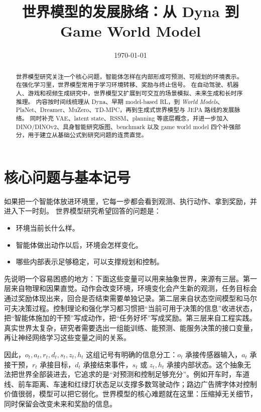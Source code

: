 \documentclass[11pt,a4paper]{ctexart}
\title{\textbf{世界模型的发展脉络：从 Dyna 到 Game World Model}}
\author{}
\date{\today}
\begin{document}
\maketitle

\begin{abstract}
世界模型研究关注一个核心问题，智能体怎样在内部形成可预测、可规划的环境表示。
在强化学习里，世界模型常用于学习环境转移、奖励与终止信号。
在自动驾驶、机器人、游戏和视频生成研究中，世界模型又扩展到可交互的场景模拟、未来生成和长时序推理。
内容按时间线梳理从 Dyna、早期 model-based RL，到 \emph{World Models}、PlaNet、Dreamer、MuZero、TD-MPC，再到生成式世界模型与 JEPA 路线的发展脉络。
同时补充 VAE、latent state、RSSM、planning 等底层概念，并进一步加入 DINO/DINOv2、具身智能研究版图、benchmark 以及 game world model 四个补强部分，用于建立从基础公式到研究问题的连贯直觉。
\end{abstract}

\tableofcontents
\clearpage

\section{核心问题与基本记号}

如果把一个智能体放进环境里，它每一步都会看到观测、执行动作、拿到奖励，并进入下一时刻。
世界模型研究希望回答的问题是：

\begin{itemize}
  \item 环境当前长什么样。
  \item 智能体做出动作以后，环境会怎样变化。
  \item 哪些内部表示足够稳定，可以支撑规划和控制。
\end{itemize}

先说明一个容易困惑的地方：下面这些变量可以用来抽象世界，来源有三层。第一层来自物理和因果直觉。动作会改变环境，环境变化会产生新的观测，任务目标会通过奖励体现出来，回合是否结束需要单独记录。第二层来自状态空间模型和马尔可夫决策过程。控制理论和强化学习都习惯把“当前可用于决策的信息”收进状态，把“智能体施加的干预”写成动作，把“任务好坏”写成奖励。第三层来自工程实践。真实世界太复杂，研究者需要选出一组能训练、能预测、能服务决策的接口变量，再让神经网络学习这些变量之间的关系。

因此，$o_t,a_t,r_t,d_t,s_t,z_t,h_t$ 这组记号有明确的信息分工：$o_t$ 承接传感器输入，$a_t$ 承接干预，$r_t$ 承接目标，$d_t$ 承接结束事件，$s_t$ 或 $z_t,h_t$ 承接内部状态。这个抽象无法把世界全部装进去，它追求的是“对预测和控制足够充分”。例如开车时，车道线、前车距离、车速和红绿灯状态足以支撑多数驾驶动作；路边广告牌字体对控制价值很弱，模型可以把它弱化。世界模型的核心难题就在这里：压缩掉无关细节，同时保留会改变未来和奖励的信息。
\end{document}
